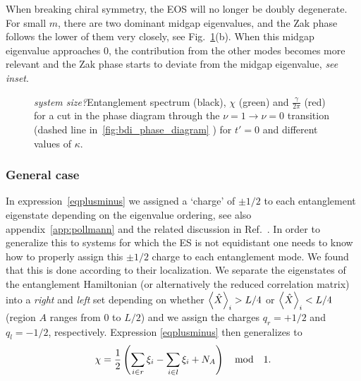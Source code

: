 \documentclass[twocolumn,amsmath,longbibliography,amssymb,superscriptaddress]{revtex4-1}
\newcommand{\mariac}[1]{{\it\color{cyan}#1}}
\begin{document}
When breaking chiral symmetry, the EOS will no longer be doubly degenerate. 
For small $m$, there are two dominant midgap eigenvalues, and the Zak phase follows the lower of them very closely, see Fig.~\ref{huang}(b).
When this midgap eigenvalue approaches  0, the contribution from the other modes becomes more relevant and the Zak phase starts to deviate from the midgap eigenvalue, \mariac{see inset}.
\begin{figure}[h!]
\centering
{}
\caption{\mariac{system size?}Entanglement spectrum (black), $\chi$ (green) and $\frac{\gamma}{2\pi}$ (red) for a cut in the phase diagram through the $\nu = 1 \rightarrow \nu = 0$ transition (dashed line in~\ref{fig:bdi_phase_diagram}
	) for $t'=0$ and different values of $\kappa$.}
\label{huang}
\end{figure}

\subsubsection{General case}

In expression~\eqref{eqplusminus} we assigned a `charge'  of $\pm1/2$ to each entanglement eigenstate depending on the eigenvalue ordering, see also appendix~\ref{app:pollmann} and the related discussion in Ref.~\cite{Zaletel2014}. 
In order to generalize this to systems for which the ES is not equidistant  one needs to know how to properly assign this $\pm 1/2$ charge to each entanglement mode. We found that this is done according to their localization. 
We separate the eigenstates of the entanglement Hamiltonian (or alternatively the reduced correlation matrix) into a \emph{right} and \emph{left} set depending on whether $\expval{\hat{X}}_i > L/4$ or $\expval{\hat{X}}_i < L/4$ (region $A$ ranges from $0$ to $L/2$) and we assign the charges $q_r = +1/2$ and $q_l = -1/2$, respectively.
 Expression \eqref{eqplusminus} then generalizes to
\begin{equation}
\chi = \frac{1}{2} \left( \sum_{i\in r}\xi_i-\sum_{i\in l}\xi_i+ N_A \right) \quad {\rm mod} \quad 1.
\label{eq_loc}
\end{equation}
\end{document}
